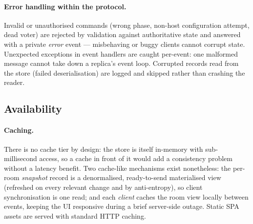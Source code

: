 \documentclass{scrartcl}
\begin{document}
\paragraph{Error handling within the protocol.}
Invalid or unauthorised commands (wrong phase, non-host configuration attempt,
dead voter) are rejected by validation against authoritative state and answered
with a private \emph{error} event --- misbehaving or buggy clients cannot corrupt
state. Unexpected exceptions in event handlers are caught per-event: one
malformed message cannot take down a replica's event loop. Corrupted records read
from the store (failed deserialisation) are logged and skipped rather than
crashing the reader.

\subsection{Availability}\label{availability}

\paragraph{Caching.}
There is no cache tier by design: the store is itself in-memory with
sub-millisecond access, so a cache in front of it would add a consistency problem
without a latency benefit. Two cache-like mechanisms exist nonetheless: the
per-room \emph{snapshot} record is a denormalised, ready-to-send materialised
view (refreshed on every relevant change and by anti-entropy), so client
synchronisation is one read; and each \emph{client} caches the room view locally
between events, keeping the UI responsive during a brief server-side outage.
Static SPA assets are served with standard HTTP caching.
\end{document}
